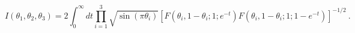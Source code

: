 \begin{equation}
I(\theta_1,\theta_2,\theta_3)= 2
\int_0^\infty dt
\prod_{i=1}^3 \sqrt{\sin (\pi \theta_i)}
[ F(\theta_i , 1-\theta_i; 1; e^{-t})
F(\theta_i , 1-\theta_i; 1; 1-e^{-t} ) ]^{-1/2}
\ .
\end{equation}

